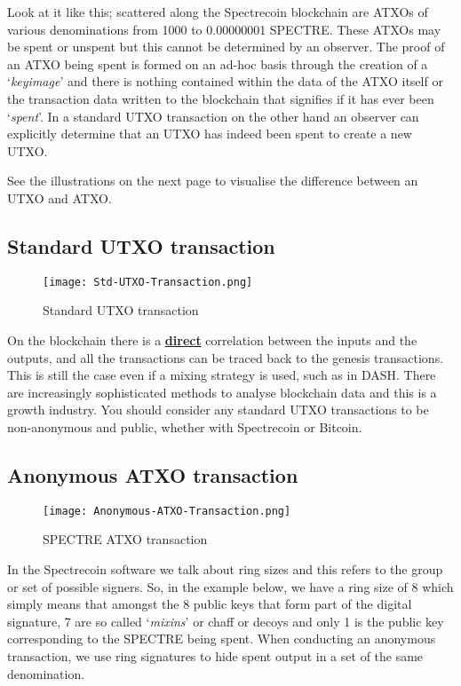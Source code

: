 Look at it like this; scattered along the Spectrecoin blockchain are ATXOs of
various denominations from 1000 to 0.00000001 SPECTRE. These ATXOs may be spent
or unspent but this cannot be determined by an observer. The proof of an ATXO
being spent is formed on an ad-hoc basis through the creation of a ‘\textit{keyimage}’
and there is nothing contained within the data of the ATXO itself or the
transaction data written to the blockchain that signifies if it has ever been
‘\textit{spent}’. In a standard UTXO transaction on the other hand an observer can
explicitly determine that an UTXO has indeed been spent to create a new UTXO.



See the illustrations on the next page to visualise the difference between an
UTXO and ATXO.



\subsection{Standard UTXO transaction}

\begin{figure}[ht]
	\caption{Standard UTXO transaction}
	\centering
	\texttt{[image: Std-UTXO-Transaction.png]}
\end{figure}



On the blockchain there is a \textbf{\underline{direct}} correlation
between the inputs and the outputs, and all the transactions can be 
traced back to the genesis transactions. This is still the case even 
if a mixing strategy is used, such as in DASH. There are increasingly 
sophisticated methods to analyse blockchain data and this is a growth 
industry. You should consider any standard UTXO transactions to be 
non-anonymous and public, whether with Spectrecoin or Bitcoin.



\subsection{Anonymous ATXO transaction}



\begin{figure}[ht]
	\caption{SPECTRE ATXO transaction}
	\centering
	\texttt{[image: Anonymous-ATXO-Transaction.png]}
\end{figure}



In the Spectrecoin software we talk about ring sizes and this refers to the
group or set of possible signers. So, in the example below, we have a ring
size of 8 which simply means that amongst the 8 public keys that form part
of the digital signature, 7 are so called ‘\textit{mixins}’ or chaff or decoys and
only 1 is the public key corresponding to the SPECTRE being spent. When
conducting an anonymous transaction, we use ring signatures to hide spent
output in a set of the same denomination.



